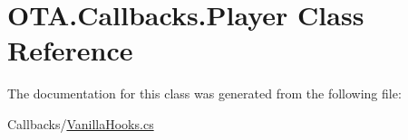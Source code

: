 \hypertarget{class_o_t_a_1_1_callbacks_1_1_player}{}\section{O\+T\+A.\+Callbacks.\+Player Class Reference}
\label{class_o_t_a_1_1_callbacks_1_1_player}


The documentation for this class was generated from the following file\+:\begin{DoxyCompactItemize}
\item 
Callbacks/\hyperlink{_vanilla_hooks_8cs}{Vanilla\+Hooks.\+cs}\end{DoxyCompactItemize}
